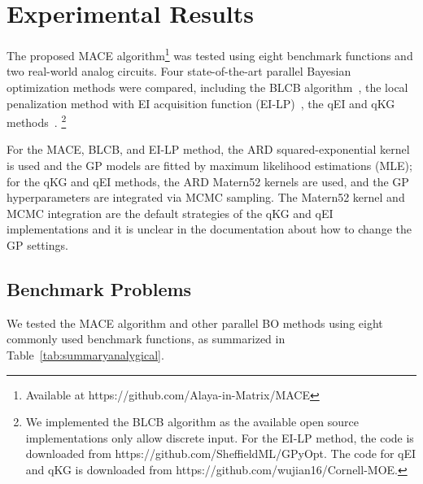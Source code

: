 \section{Experimental Results}

The proposed MACE algorithm\footnote{Available at https://github.com/Alaya-in-Matrix/MACE} was tested using eight benchmark functions and two
real-world analog circuits. Four state-of-the-art parallel Bayesian optimization
methods were compared, including the BLCB
algorithm~\cite{desautels2014parallelizing}, the local penalization method with
EI acquisition function (EI-LP)~\cite{gonzalez2016batch}, the qEI and qKG
methods~\cite{qEI,wu2016parallel}. \footnote{We implemented the BLCB algorithm as
the available open source implementations only allow discrete input. For the
EI-LP method, the code is downloaded from
https://github.com/SheffieldML/GPyOpt. The code for qEI and qKG is downloaded
from https://github.com/wujian16/Cornell-MOE.}

For the MACE, BLCB, and EI-LP method, the ARD squared-exponential kernel is
used and the GP models are fitted by maximum likelihood estimations (MLE); for
the qKG and qEI methods, the ARD Matern52 kernels are used, and the GP
hyperparameters are integrated via MCMC sampling. The Matern52 kernel and MCMC
integration are the default strategies of the qKG and qEI implementations and
it is unclear in the documentation about how to change the GP settings.


\subsection{Benchmark Problems}

We tested the MACE algorithm and other parallel BO methods using eight commonly used benchmark
functions, as summarized in Table~\ref{tab:summaryanalygical}.

